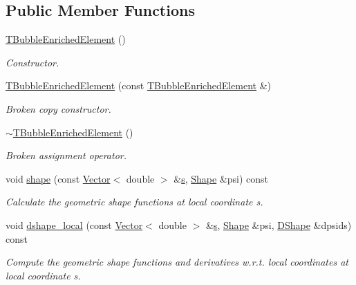 \subsection*{Public Member Functions}
\begin{DoxyCompactItemize}
\item 
\hyperlink{classoomph_1_1TBubbleEnrichedElement_3_01DIM_00_013_01_4_ad7b4bb73defa6c522acf3f08c4b73027}{T\+Bubble\+Enriched\+Element} ()
\begin{DoxyCompactList}\small\item\em Constructor. \end{DoxyCompactList}\item 
\hyperlink{classoomph_1_1TBubbleEnrichedElement_3_01DIM_00_013_01_4_a7dbc888e1901bc871449633d109bf705}{T\+Bubble\+Enriched\+Element} (const \hyperlink{classoomph_1_1TBubbleEnrichedElement}{T\+Bubble\+Enriched\+Element} \&)
\begin{DoxyCompactList}\small\item\em Broken copy constructor. \end{DoxyCompactList}\item 
\hyperlink{classoomph_1_1TBubbleEnrichedElement_3_01DIM_00_013_01_4_a94fae605fd85dca13c1f491e897b792c}{$\sim$\+T\+Bubble\+Enriched\+Element} ()
\begin{DoxyCompactList}\small\item\em Broken assignment operator. \end{DoxyCompactList}\item 
void \hyperlink{classoomph_1_1TBubbleEnrichedElement_3_01DIM_00_013_01_4_a874e11ea0e72ee05ac9de81e3ba7fe97}{shape} (const \hyperlink{classoomph_1_1Vector}{Vector}$<$ double $>$ \&\hyperlink{cfortran_8h_ab7123126e4885ef647dd9c6e3807a21c}{s}, \hyperlink{classoomph_1_1Shape}{Shape} \&psi) const
\begin{DoxyCompactList}\small\item\em Calculate the geometric shape functions at local coordinate s. \end{DoxyCompactList}\item 
void \hyperlink{classoomph_1_1TBubbleEnrichedElement_3_01DIM_00_013_01_4_abf68d2c613e7876e949bbd61765d0c91}{dshape\+\_\+local} (const \hyperlink{classoomph_1_1Vector}{Vector}$<$ double $>$ \&\hyperlink{cfortran_8h_ab7123126e4885ef647dd9c6e3807a21c}{s}, \hyperlink{classoomph_1_1Shape}{Shape} \&psi, \hyperlink{classoomph_1_1DShape}{D\+Shape} \&dpsids) const
\begin{DoxyCompactList}\small\item\em Compute the geometric shape functions and derivatives w.\+r.\+t. local coordinates at local coordinate s. \end{DoxyCompactList}\item 

\end{DoxyCompactItemize}

